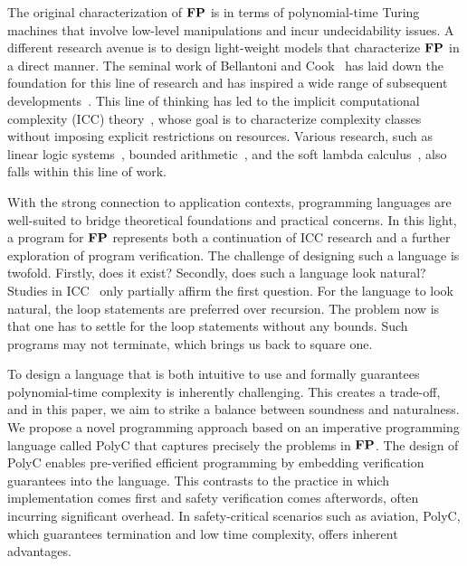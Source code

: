 \documentclass[runningheads]{llncs}
\begin{document}
The original characterization of $\mathbf{FP}$ is in terms of polynomial-time Turing machines that involve low-level manipulations and incur undecidability issues.
A different research avenue is to design light-weight models that characterize $\mathbf{FP}$ in a direct manner.
The seminal work of Bellantoni and Cook~\cite{bellantoni1992new} has laid down the foundation for this line of research and has inspired a wide range of subsequent developments~\cite{oitavem2022polynomial,hainry2020tier,hainry2023programming}.
This line of thinking has led to the implicit computational complexity (ICC) theory~\cite{dal2010short}, whose goal is to characterize complexity classes without imposing explicit restrictions on resources.
Various research, such as linear logic systems~\cite{girard1987linear,lafont2004soft}, bounded arithmetic~\cite{buss1985bounded,buss1986polynomial,gurevich1983algebras,hainry2021complexityparser}, and the soft lambda calculus~\cite{baillot2004soft}, also falls within this line of work.

With the strong connection to application contexts, programming languages are well-suited to bridge theoretical foundations and practical concerns.
In this light, a program for $\mathbf{FP}$ represents both a continuation of ICC research and a further exploration of program verification.
The challenge of designing such a language is twofold.
Firstly, does it exist?
Secondly, does such a language look natural?
Studies in ICC~\cite{jones1999logspace,marion2011type,hainry2023general} only partially affirm the first question.
For the language to look natural, the loop statements are preferred over recursion.
The problem now is that one has to settle for the loop statements without any bounds.
Such programs may not terminate, which brings us back to square one.

To design a language that is both intuitive to use and formally guarantees polynomial-time complexity is inherently challenging.
This creates a trade-off, and in this paper, we aim to strike a balance between soundness and naturalness.
We propose a novel programming approach based on an imperative programming language called PolyC that captures precisely the problems in $\mathbf{FP}$.
The design of PolyC enables pre-verified efficient programming by embedding verification guarantees into the language. 
This contrasts to the practice in which implementation comes first and safety verification comes afterwords, often incurring significant overhead.
In safety-critical scenarios such as aviation, PolyC, which guarantees termination and low time complexity, offers inherent advantages.
\end{document}
